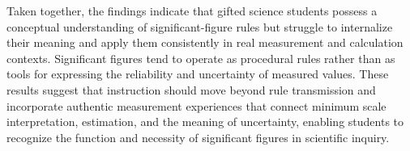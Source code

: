 Taken together, the findings indicate that gifted science students possess
a conceptual understanding of significant-figure rules but struggle to
internalize their meaning and apply them consistently in real measurement and
calculation contexts. Significant figures tend to operate as procedural rules
rather than as tools for expressing the reliability and uncertainty of measured values.
These results suggest that instruction should move beyond rule transmission and
incorporate authentic measurement experiences that connect minimum scale interpretation,
estimation, and the meaning of uncertainty, enabling students to recognize the function
and necessity of significant figures in scientific inquiry.